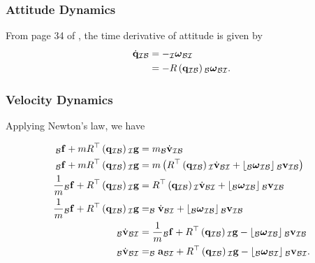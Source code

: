 \documentclass{beamer}
\begin{document}
\begin{frame}
\frametitle{Attitude Dynamics}
From page 34 of \cite{key-4}, the time derivative of attitude is
given by
\begin{align}
\dot{{\bf q}}_{\mathcal{I}\mathcal{B}} & =-_{\mathcal{I}}\boldsymbol{\omega}_{\mathcal{B}\mathcal{I}}\\
 & =-R\left({\bf q}_{\mathcal{I}\mathcal{B}}\right){}_{\mathcal{B}}\boldsymbol{\omega}_{\mathcal{B}\mathcal{I}}.
\end{align}
\end{frame}


\begin{frame}
\frametitle{Velocity Dynamics}
Applying Newton's law, we have

\begin{align}
_{\mathcal{B}}{\bf f}+mR^{\top}\left({\bf q}_{\mathcal{I}\mathcal{B}}\right){}_{\mathcal{I}}{\bf g} & =m_{\mathcal{B}}\dot{{\bf v}}_{\mathcal{I}\mathcal{B}}\\
_{\mathcal{B}}{\bf f}+mR^{\top}\left({\bf q}_{\mathcal{I}\mathcal{B}}\right){}_{\mathcal{I}}{\bf g} & =m\left(R^{\top}\left({\bf q}_{\mathcal{I}\mathcal{B}}\right){}_{\mathcal{I}}\dot{{\bf v}}_{\mathcal{B}\mathcal{I}}+\left\lfloor _{\mathcal{B}}\boldsymbol{\omega}_{\mathcal{I}\mathcal{B}}\right\rfloor {}_{\mathcal{B}}{\bf v}_{\mathcal{I}\mathcal{B}}\right)\\
\frac{1}{m}{}_{\mathcal{B}}{\bf f}+R^{\top}\left({\bf q}_{\mathcal{I}\mathcal{B}}\right){}_{\mathcal{I}}{\bf g} & =R^{\top}\left({\bf q}_{\mathcal{I}\mathcal{B}}\right){}_{\mathcal{I}}\dot{{\bf v}}_{\mathcal{B}\mathcal{I}}+\left\lfloor _{\mathcal{B}}\boldsymbol{\omega}_{\mathcal{I}\mathcal{B}}\right\rfloor {}_{\mathcal{B}}{\bf v}_{\mathcal{I}\mathcal{B}}\\
\frac{1}{m}{}_{\mathcal{B}}{\bf f}+R^{\top}\left({\bf q}_{\mathcal{I}\mathcal{B}}\right){}_{\mathcal{I}}{\bf g} & =_{\mathcal{B}}\dot{{\bf v}}_{\mathcal{B}\mathcal{I}}+\left\lfloor _{\mathcal{B}}\boldsymbol{\omega}_{\mathcal{I}\mathcal{B}}\right\rfloor {}_{\mathcal{B}}{\bf v}_{\mathcal{I}\mathcal{B}}\\
_{\mathcal{B}}\dot{{\bf v}}_{\mathcal{B}\mathcal{I}} & =\frac{1}{m}{}_{\mathcal{B}}{\bf f}+R^{\top}\left({\bf q}_{\mathcal{I}\mathcal{B}}\right){}_{\mathcal{I}}{\bf g}-\left\lfloor _{\mathcal{B}}\boldsymbol{\omega}_{\mathcal{I}\mathcal{B}}\right\rfloor {}_{\mathcal{B}}{\bf v}_{\mathcal{I}\mathcal{B}}\\
_{\mathcal{B}}\dot{{\bf v}}_{\mathcal{B}\mathcal{I}} & =_{\mathcal{B}}{\bf a}_{\mathcal{B}\mathcal{I}}+R^{\top}\left({\bf q}_{\mathcal{I}\mathcal{B}}\right){}_{\mathcal{I}}{\bf g}-\left\lfloor _{\mathcal{B}}\boldsymbol{\omega}_{\mathcal{B}\mathcal{I}}\right\rfloor {}_{\mathcal{B}}{\bf v}_{\mathcal{B}\mathcal{I}}.
\end{align}
\end{frame}
\end{document}
